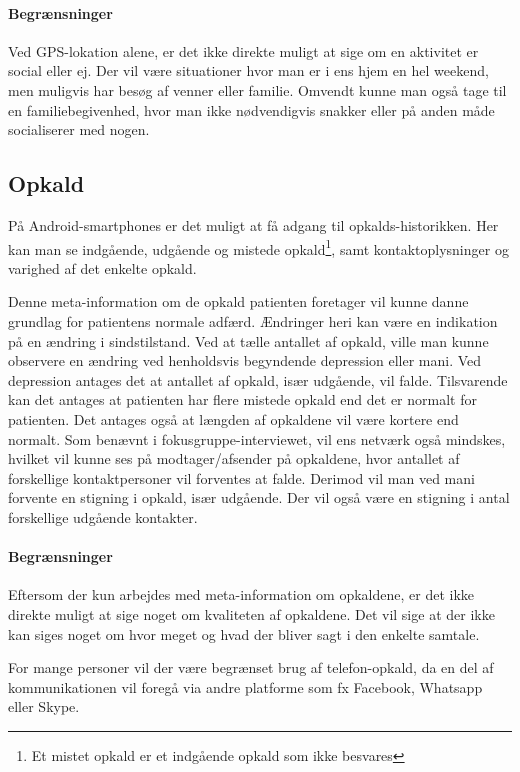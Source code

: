 \paragraph{Begrænsninger}
Ved GPS-lokation alene, er det ikke direkte muligt at sige om en aktivitet er social eller ej.
Der vil være situationer hvor man er i ens hjem en hel weekend, men muligvis har besøg af venner eller familie.
Omvendt kunne man også tage til en familiebegivenhed, hvor man ikke nødvendigvis snakker eller på anden måde socialiserer med nogen.

\subsection{Opkald}
På Android-smartphones er det muligt at få adgang til opkalds-historikken.
Her kan man se indgående, udgående og mistede opkald\footnote{Et mistet opkald er et indgående opkald som ikke besvares}, samt kontaktoplysninger og varighed af det enkelte opkald.

Denne meta-information om de opkald patienten foretager vil kunne danne grundlag for patientens normale adfærd.
Ændringer heri kan være en indikation på en ændring i sindstilstand.
Ved at tælle antallet af opkald, ville man kunne observere en ændring ved henholdsvis begyndende depression eller mani.
Ved depression antages det at antallet af opkald, især udgående, vil falde.
Tilsvarende kan det antages at patienten har flere mistede opkald end det er normalt for patienten.
Det antages også at længden af opkaldene vil være kortere end normalt.
Som benævnt i fokusgruppe-interviewet, vil ens netværk også mindskes, hvilket vil kunne ses på modtager/afsender på opkaldene, hvor antallet af forskellige kontaktpersoner vil forventes at falde.
Derimod vil man ved mani forvente en stigning i opkald, især udgående.
Der vil også være en stigning i antal forskellige udgående kontakter.

\paragraph{Begrænsninger}
Eftersom der kun arbejdes med meta-information om opkaldene, er det ikke direkte muligt at sige noget om kvaliteten af opkaldene.
Det vil sige at der ikke kan siges noget om hvor meget og hvad der bliver sagt i den enkelte samtale.

For mange personer  vil der være begrænset brug af telefon-opkald, da en del af kommunikationen vil foregå via andre platforme som fx Facebook, Whatsapp eller Skype.

